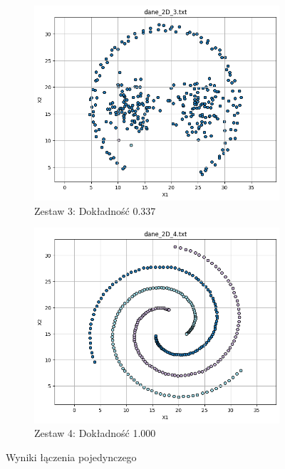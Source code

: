 \documentclass[polish,12pt,a4paper]{extarticle}
\begin{document}
\begin{figure}[h!]
    \centering
    \begin{subfigure}[b]{0.30\textwidth}
        \includegraphics[width=\linewidth]{img/hierarchical/singular/data3.png}
        \captionsetup{labelformat=empty}
        \caption{Zestaw 3: Dokładność 0.337}
    \end{subfigure}
    \begin{subfigure}[b]{0.30\textwidth}
        \includegraphics[width=\linewidth]{img/hierarchical/singular/data4.png}
        \captionsetup{labelformat=empty}
        \caption{Zestaw 4: Dokładność 1.000}
    \end{subfigure}
    \label{fig:data_grid}
    \caption{Wyniki łączenia pojedynczego}
\end{figure} \FloatBarrier
\end{document}
